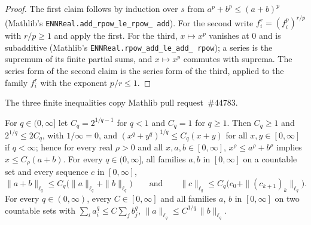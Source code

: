 \begin{proof}
\leanok
The first claim follows by induction over $s$ from $a^p + b^p \leq (a + b)^p$ (Mathlib's
\texttt{ENNReal.\allowbreak add\_\allowbreak rpow\_\allowbreak le\_\allowbreak rpow\_\allowbreak
add}). For the second write $f_i^r = (f_i^p)^{r/p}$ with $r/p \geq 1$ and apply the first. For
the third, $x \mapsto x^p$ vanishes at $0$ and is subadditive (Mathlib's
\texttt{ENNReal.\allowbreak rpow\_\allowbreak add\_\allowbreak le\_\allowbreak add\_\allowbreak
rpow}); a series is the supremum of its finite partial sums, and $x \mapsto x^p$ commutes with
suprema. The series form of the second claim is the series form of the third, applied to the
family $f_i^r$ with the exponent $p/r \leq 1$.
\end{proof}

The three finite inequalities copy Mathlib pull request~\#44783.

\begin{lemma}
\label{lem:lq-quasi-triangle}
\leanok
{}
For $q \in (0, \infty]$ let $C_q = 2^{1/q - 1}$ for $q < 1$ and $C_q = 1$ for $q \geq 1$. Then
$C_q \geq 1$ and $2^{1/q} \leq 2 C_q$, with $1/\infty = 0$, and
$(x^q + y^q)^{1/q} \leq C_q (x + y)$ for all $x, y \in [0, \infty]$ if $q < \infty$; hence for
every real $\rho > 0$ and all $x, a, b \in [0, \infty]$, $x^\rho \leq a^\rho + b^\rho$ implies
$x \leq C_\rho (a + b)$. For every
$q \in (0, \infty]$, all families $a, b$ in $[0, \infty]$ on a countable set and every sequence
$c$ in $[0, \infty]$,
\[
  \|a + b\|_{\ell_q} \leq C_q \bigl(\|a\|_{\ell_q} + \|b\|_{\ell_q}\bigr)
  \qquad \text{and} \qquad
  \|c\|_{\ell_q} \leq C_q \bigl(c_0 + \|(c_{k+1})_k\|_{\ell_q}\bigr) .
\]
For every $q \in (0, \infty)$, every $C \in [0, \infty]$ and all families $a$, $b$ in
$[0, \infty]$ on two countable sets with $\sum_i a_i^q \leq C \sum_j b_j^q$,
$\|a\|_{\ell_q} \leq C^{1/q} \, \|b\|_{\ell_q}$.
\end{lemma}

